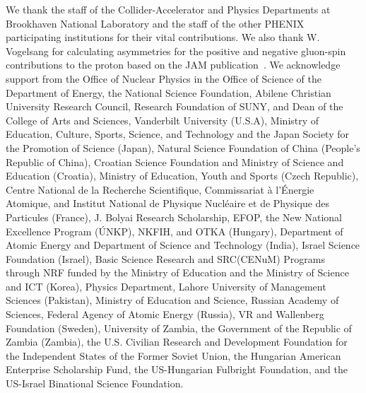 \documentclass[twocolumn,letterpaper,aps,prl,longbibliography,superscriptaddress,floatfix]{revtex4-2}
\begin{document}
We thank the staff of the Collider-Accelerator and Physics
Departments at Brookhaven National Laboratory and the staff of
the other PHENIX participating institutions for their vital
contributions.    We also thank W. Vogelsang for calculating 
asymmetries for the positive and negative gluon-spin 
contributions to the proton based on the JAM 
publication~\cite{PhysRevD.105.074022}.
We acknowledge support from the Office of Nuclear Physics in the
Office of Science of the Department of Energy,
the National Science Foundation,
Abilene Christian University Research Council,
Research Foundation of SUNY, and
Dean of the College of Arts and Sciences, Vanderbilt University
(U.S.A),
Ministry of Education, Culture, Sports, Science, and Technology
and the Japan Society for the Promotion of Science (Japan),
Natural Science Foundation of China (People's Republic of China),
Croatian Science Foundation and
Ministry of Science and Education (Croatia),
Ministry of Education, Youth and Sports (Czech Republic),
Centre National de la Recherche Scientifique, Commissariat
{\`a} l'{\'E}nergie Atomique, and Institut National de Physique
Nucl{\'e}aire et de Physique des Particules (France),
J. Bolyai Research Scholarship, EFOP, the New National Excellence
Program ({\'U}NKP), NKFIH, and OTKA (Hungary),
Department of Atomic Energy and Department of Science and Technology
(India),
Israel Science Foundation (Israel),
Basic Science Research and SRC(CENuM) Programs through NRF
funded by the Ministry of Education and the Ministry of
Science and ICT (Korea),
Physics Department, Lahore University of Management Sciences (Pakistan),
Ministry of Education and Science, Russian Academy of Sciences,
Federal Agency of Atomic Energy (Russia),
VR and Wallenberg Foundation (Sweden),
University of Zambia, the Government of the Republic of Zambia (Zambia),
the U.S. Civilian Research and Development Foundation for the
Independent States of the Former Soviet Union,
the Hungarian American Enterprise Scholarship Fund,
the US-Hungarian Fulbright Foundation,
and the US-Israel Binational Science Foundation.


\end{document}
